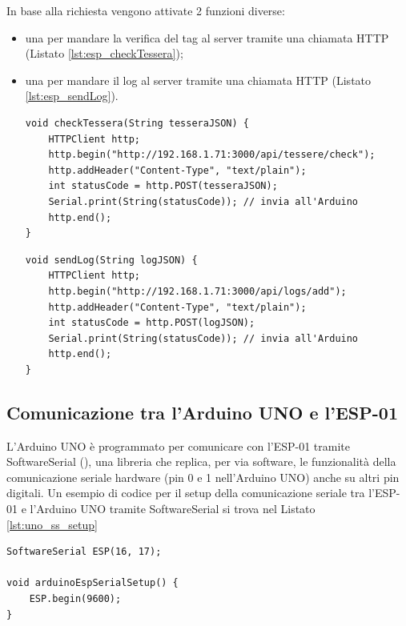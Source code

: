 \documentclass[12pt]{report}
\begin{document}
\noindent In base alla richiesta vengono attivate 2 funzioni diverse:
\begin{itemize}
	\item una per mandare la verifica del tag al server tramite una chiamata HTTP (Listato \ref{lst:esp_checkTessera});
	\item una per mandare il log al server tramite una chiamata HTTP (Listato \ref{lst:esp_sendLog}).
	
\begin{lstlisting}[caption={L'ESP-01 manda una richiesta POST all'endpoint specificato. Il corpo della richiesta è in formato JSON e include il seriale e il tipo della tessera che si vuole verificare.}, label={lst:esp_checkTessera}, xleftmargin=\dimexpr-\leftmargini]
void checkTessera(String tesseraJSON) {
	HTTPClient http;
	http.begin("http://192.168.1.71:3000/api/tessere/check");
	http.addHeader("Content-Type", "text/plain");
	int statusCode = http.POST(tesseraJSON);
	Serial.print(String(statusCode)); // invia all'Arduino
	http.end();
}
\end{lstlisting}
\begin{lstlisting}[caption={L'ESP-01 manda una richiesta POST all'endpoint specificato. Il corpo della richiesta è in formato JSON e rappresenta il log.}, label={lst:esp_sendLog}, xleftmargin=\dimexpr-\leftmargini]
void sendLog(String logJSON) {
	HTTPClient http;
	http.begin("http://192.168.1.71:3000/api/logs/add");
	http.addHeader("Content-Type", "text/plain");
	int statusCode = http.POST(logJSON);
	Serial.print(String(statusCode)); // invia all'Arduino
	http.end();
}
\end{lstlisting}

\end{itemize}

\subsection{Comunicazione tra l'Arduino UNO e l'ESP-01 }

L'Arduino UNO è programmato per comunicare con l'ESP-01 tramite SoftwareSerial (\cite{softwareserial_lib}), una libreria che replica, per via software, le funzionalità della comunicazione seriale hardware (pin 0 e 1 nell'Arduino UNO) anche su altri pin digitali. Un esempio di codice per il setup della comunicazione seriale tra l'ESP-01 e l'Arduino UNO tramite SoftwareSerial si trova nel Listato \ref{lst:uno_ss_setup}
\begin{lstlisting}[caption={Inizializzazione della comunicazione seriale tra Arduino UNO e ESP-01}, label={lst:uno_ss_setup}]
SoftwareSerial ESP(16, 17);

void arduinoEspSerialSetup() {
	ESP.begin(9600);
}
\end{lstlisting}
\end{document}
